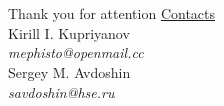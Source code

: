 \documentclass[xcolor=x11names,compress]{beamer}
\renewcommand{\(}{\begin{columns}}
\renewcommand{\)}{\end{columns}}
\newcommand{\<}[1]{\begin{column}{#1}}
\renewcommand{\>}{\end{column}}
\begin{document}
\section{}
\begin{frame}{Thank you for attention}
    \underline{Contacts}\\

    \vspace{0.5cm}
    Kirill I. Kupriyanov\\
    \emph{mephisto@openmail.cc}\\

    \vspace{0.3cm}
    Sergey M. Avdoshin\\
    \emph{savdoshin@hse.ru}
\end{frame}
\end{document}
